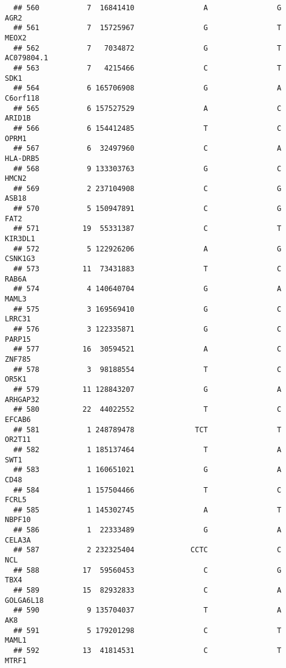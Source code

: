 \documentclass[12pt,twoside]{reedthesis}
\theoremstyle{definition}
\theoremstyle{definition}
\theoremstyle{remark}
\begin{document}
\begin{verbatim}
  ## 560           7  16841410                A                G           AGR2
  ## 561           7  15725967                G                T          MEOX2
  ## 562           7   7034872                G                T     AC079804.1
  ## 563           7   4215466                C                T           SDK1
  ## 564           6 165706908                G                A       C6orf118
  ## 565           6 157527529                A                C         ARID1B
  ## 566           6 154412485                T                C          OPRM1
  ## 567           6  32497960                C                A       HLA-DRB5
  ## 568           9 133303763                G                C          HMCN2
  ## 569           2 237104908                C                G          ASB18
  ## 570           5 150947891                C                G           FAT2
  ## 571          19  55331387                C                T        KIR3DL1
  ## 572           5 122926206                A                G        CSNK1G3
  ## 573          11  73431883                T                C          RAB6A
  ## 574           4 140640704                G                A          MAML3
  ## 575           3 169569410                G                C         LRRC31
  ## 576           3 122335871                G                C         PARP15
  ## 577          16  30594521                A                C         ZNF785
  ## 578           3  98188554                T                C          OR5K1
  ## 579          11 128843207                G                A       ARHGAP32
  ## 580          22  44022552                T                C         EFCAB6
  ## 581           1 248789478              TCT                T         OR2T11
  ## 582           1 185137464                T                A           SWT1
  ## 583           1 160651021                G                A           CD48
  ## 584           1 157504466                T                C          FCRL5
  ## 585           1 145302745                A                T         NBPF10
  ## 586           1  22333489                G                A         CELA3A
  ## 587           2 232325404             CCTC                C            NCL
  ## 588          17  59560453                C                G           TBX4
  ## 589          15  82932833                C                A      GOLGA6L18
  ## 590           9 135704037                T                A            AK8
  ## 591           5 179201298                C                T          MAML1
  ## 592          13  41814531                C                T          MTRF1

\end{verbatim}
\end{document}
